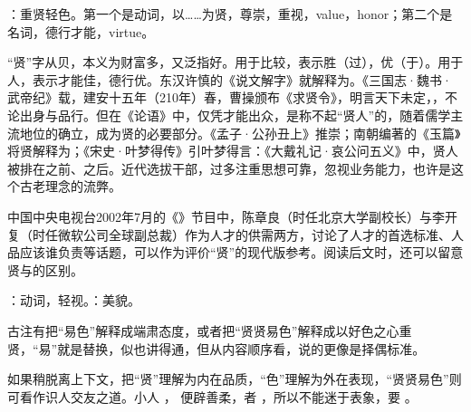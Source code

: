 {
\item {}：重贤轻色。第一个是动词，以……为贤，尊崇，重视，value，honor；第二个是名词，德行才能，virtue。

“贤”字从贝，本义为财富多，又泛指好。用于比较，表示胜（过），优（于）。用于人，表示才能佳，德行优。东汉许慎的《说文解字》就解释为。《三国志·魏书·武帝纪》载，建安十五年（210年）春，曹操颁布《求贤令》，明言天下未定，，不论出身与品行。但在《论语》中，仅凭才能出众，是称不起“贤人”的，随着儒学主流地位的确立，成为贤的必要部分。《孟子·公孙丑上》推崇；南朝编著的《玉篇》将贤解释为；《宋史·叶梦得传》引叶梦得言：《大戴礼记·哀公问五义》中，贤人被排在之前、之后。近代选拔干部，过多注重思想可靠，忽视业务能力，也许是这个古老理念的流弊。

中国中央电视台2002年7月的《》节目中，陈章良（时任北京大学副校长）与李开复（时任微软公司全球副总裁）作为人才的供需两方，讨论了人才的首选标准、人品应该谁负责等话题，可以作为评价“贤”的现代版参考。阅读后文时，还可以留意贤与的区别。

：动词，轻视。：美貌。

古注有把“易色”解释成端肃态度，或者把“贤贤易色”解释成以好色之心重贤，“易”就是替换，似也讲得通，但从内容顺序看，说的更像是择偶标准。

如果稍脱离上下文，把“贤”理解为内在品质，“色”理解为外在表现，“贤贤易色”则可看作识人交友之道。小人  ， 便辟善柔，者  ，所以不能迷于表象，要  。

}
